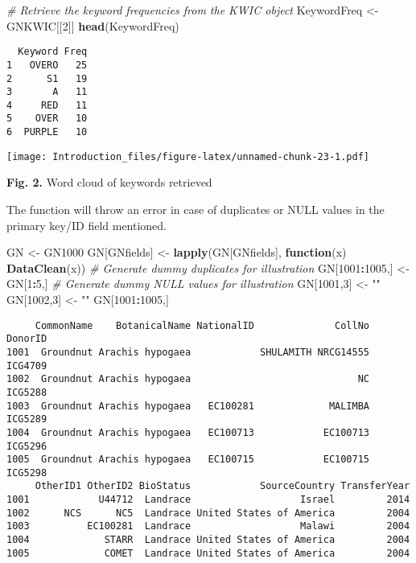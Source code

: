 \documentclass[]{article}
\newenvironment{Shaded}{\begin{snugshade}}{\end{snugshade}}
\newcommand{\CommentTok}[1]{\textcolor[rgb]{0.56,0.35,0.01}{\textit{#1}}}
\newcommand{\ControlFlowTok}[1]{\textcolor[rgb]{0.13,0.29,0.53}{\textbf{#1}}}
\newcommand{\DecValTok}[1]{\textcolor[rgb]{0.00,0.00,0.81}{#1}}
\newcommand{\KeywordTok}[1]{\textcolor[rgb]{0.13,0.29,0.53}{\textbf{#1}}}
\newcommand{\NormalTok}[1]{#1}
\newcommand{\OperatorTok}[1]{\textcolor[rgb]{0.81,0.36,0.00}{\textbf{#1}}}
\newcommand{\StringTok}[1]{\textcolor[rgb]{0.31,0.60,0.02}{#1}}
\begin{document}
\begin{Shaded}
\begin{Highlighting}[]
\CommentTok{# Retrieve the keyword frequencies from the KWIC object}
\NormalTok{KeywordFreq <-}\StringTok{ }\NormalTok{GNKWIC[[}\DecValTok{2}\NormalTok{]]}
\KeywordTok{head}\NormalTok{(KeywordFreq)}
\end{Highlighting}
\end{Shaded}

\begin{verbatim}
  Keyword Freq
1   OVERO   25
2      S1   19
3       A   11
4     RED   11
5    OVER   10
6  PURPLE   10
\end{verbatim}

\texttt{[image: Introduction\_files/figure-latex/unnamed-chunk-23-1.pdf]}

\textbf{Fig. 2.} Word cloud of keywords retrieved

The function will throw an error in case of duplicates or NULL values in
the primary key/ID field mentioned.

\begin{Shaded}
\begin{Highlighting}[]
\NormalTok{GN <-}\StringTok{ }\NormalTok{GN1000}
\NormalTok{GN[GNfields] <-}\StringTok{ }\KeywordTok{lapply}\NormalTok{(GN[GNfields], }\ControlFlowTok{function}\NormalTok{(x) }\KeywordTok{DataClean}\NormalTok{(x))}
\CommentTok{# Generate dummy duplicates for illustration}
\NormalTok{GN[}\DecValTok{1001}\OperatorTok{:}\DecValTok{1005}\NormalTok{,] <-}\StringTok{ }\NormalTok{GN[}\DecValTok{1}\OperatorTok{:}\DecValTok{5}\NormalTok{,]}
\CommentTok{# Generate dummy NULL values for illustration}
\NormalTok{GN[}\DecValTok{1001}\NormalTok{,}\DecValTok{3}\NormalTok{] <-}\StringTok{ ""}
\NormalTok{GN[}\DecValTok{1002}\NormalTok{,}\DecValTok{3}\NormalTok{] <-}\StringTok{ ""}
\NormalTok{GN[}\DecValTok{1001}\OperatorTok{:}\DecValTok{1005}\NormalTok{,]}
\end{Highlighting}
\end{Shaded}

\begin{verbatim}
     CommonName    BotanicalName NationalID              CollNo DonorID
1001  Groundnut Arachis hypogaea            SHULAMITH NRCG14555 ICG4709
1002  Groundnut Arachis hypogaea                             NC ICG5288
1003  Groundnut Arachis hypogaea   EC100281             MALIMBA ICG5289
1004  Groundnut Arachis hypogaea   EC100713            EC100713 ICG5296
1005  Groundnut Arachis hypogaea   EC100715            EC100715 ICG5298
     OtherID1 OtherID2 BioStatus            SourceCountry TransferYear
1001            U44712  Landrace                   Israel         2014
1002      NCS      NC5  Landrace United States of America         2004
1003          EC100281  Landrace                   Malawi         2004
1004             STARR  Landrace United States of America         2004
1005             COMET  Landrace United States of America         2004
\end{verbatim}
\end{document}
